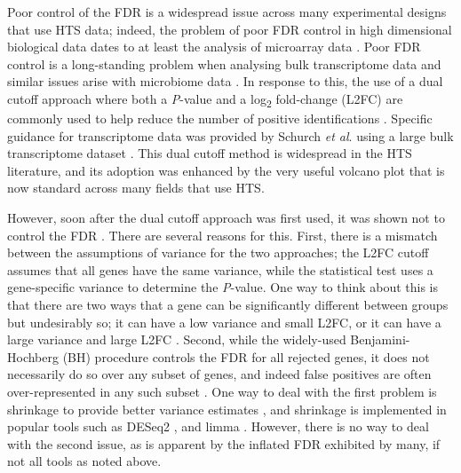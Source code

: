 \documentclass[10pt,letterpaper]{article}
\begin{document}
Poor control of the FDR is a widespread issue across many experimental designs that use HTS data; indeed, the problem of poor FDR control in high dimensional biological data dates to at least the analysis of microarray data \cite{Cui:2003aa}. Poor FDR control is a long-standing problem when analysing bulk transcriptome data \cite{Soneson:2013, li_exaggerated_2022} and similar issues arise with microbiome data \cite{hawinkel2017, Nearing:2022aa}. In response to this, the use of a dual cutoff approach where both a \textit{P}-value and a log\textsubscript{2} fold-change (L2FC) are commonly used  to help reduce the number of positive identifications \cite{Cui:2003aa}. Specific guidance for transcriptome data was provided by Schurch \textit{et al}. using a large bulk transcriptome dataset \cite{schurch_how_2016}. This dual cutoff method is widespread in the HTS literature, and its adoption was enhanced by the very useful volcano plot \cite{Cui:2003aa} that is now standard across many fields that use HTS.

However, soon after the dual cutoff approach was first used, it was shown not to control the FDR \cite{Zhang:2009aa}. There are several reasons for this. First, there is a mismatch between the assumptions of variance for the two approaches; the L2FC cutoff assumes that all genes have the same variance, while the statistical test uses a gene-specific variance to determine the \textit{P}-value. One way to think about this is that there are two ways that a gene can be significantly different between groups but undesirably so; it can have a low variance and small L2FC, or it can have a large variance and large L2FC \cite{ebrahimpoor_inflated_2021}. Second, while the widely-used Benjamini-Hochberg \cite{benjamini:1995} (BH) procedure controls the FDR for all rejected genes, it does not necessarily do so over any subset of genes, and indeed false positives are often over-represented in any such subset \cite{Goeman:2014aa, ebrahimpoor_inflated_2021}. One way to deal with the first problem is shrinkage to provide better variance estimates \cite{Zhang:2009aa}, and shrinkage is implemented in popular tools such as DESeq2 \cite{love_moderated_2014}, and limma \cite{ritchie_limma_2015}. However, there is no way to deal with the second issue, as is apparent by the inflated FDR exhibited by many, if not all tools as noted above.
\end{document}

